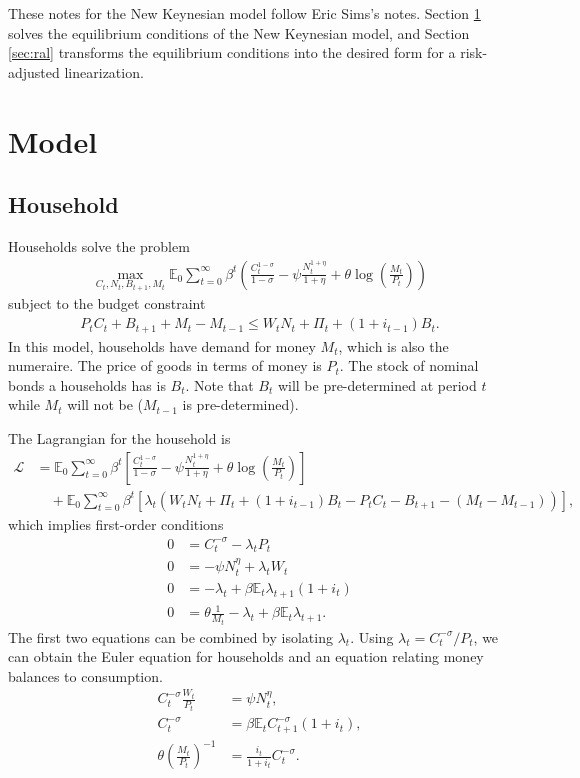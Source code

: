 \documentclass[12 pt, oneside]{article}
\theoremstyle{definition}
\theoremstyle{definition}
\theoremstyle{definition}
\newcommand{\E}{\mathbb{E}}
\newcommand{\calL}{\mathcal{L}}
\begin{document}
These notes for the New Keynesian model follow Eric Sims's notes. Section \ref{sec:model} solves the equilibrium conditions of the New Keynesian model, and Section \ref{sec:ral} transforms the equilibrium conditions into the desired form for a risk-adjusted linearization.

\section{Model}\label{sec:model}


\subsection{Household}

Households solve the problem
\begin{align*}
  \max_{C_t, N_t, B_{t + 1}, M_t} \E_0 \sum_{t = 0}^\infty \beta^t \left( \frac{C_t^{1 - \sigma}}{1 - \sigma} - \psi \frac{N_t^{1 + \eta}}{1 + \eta} + \theta\log\left(\frac{M_t}{P_t}\right) \right)
\end{align*}
subject to the budget constraint
\begin{align*}
  P_tC_t + B_{t + 1} + M_t - M_{t - 1} \leq W_t N_t + \Pi_t + (1 + i_{t - 1})B_t.
\end{align*}
In this model, households have demand for money $M_t$, which is also the numeraire. The price of goods in terms of money is $P_t$.
The stock of nominal bonds a households has is $B_t$.
Note that $B_t$ will be pre-determined at period $t$ while $M_t$ will not be ($M_{t - 1}$ is pre-determined).

The Lagrangian for the household is
\begin{align*}
\calL & = \E_0 \sum_{t = 0}^\infty \beta^t\left[\frac{C_t^{1 - \sigma}}{1 - \sigma} - \psi \frac{N_t^{1 + \eta}}{1 + \eta} + \theta\log\left(\frac{M_t}{P_t}\right)\right]\\
        &\quad + \E_0 \sum_{t = 0}^\infty \beta^t\left[\lambda_t( W_t N_t + \Pi_t + (1 + i_{t - 1})B_t-  P_tC_t - B_{t + 1} - (M_t - M_{t - 1}))\right],
\end{align*}
which implies first-order conditions
\begin{align*}
  0 & = C_t^{- \sigma} - \lambda_t P_t\\
  0 & = -\psi N_t^\eta + \lambda_t W_t\\
  0 & = -\lambda_t + \beta \E_t\lambda_{t + 1}(1 + i_t)\\
  0 & = \theta \frac{1}{M_t} - \lambda_t + \beta\E_t\lambda_{t + 1}.
\end{align*}
The first two equations can be combined by isolating $\lambda_t$.
Using $\lambda_t = C_t^{-\sigma} / P_t$, we can obtain the Euler equation for households
and an equation relating money balances to consumption.
\begin{align*}
  C_t^{-\sigma} \frac{W_t}{P_t} & = \psi N_t^\eta,\\
  C_t^{-\sigma} & = \beta\E_t C_{t + 1}^{-\sigma} ( 1 + i_t),\\
  \theta\left(\frac{M_t}{P_t}\right)^{-1} & = \frac{i_t}{1 + i_t}C_t^{-\sigma}.
\end{align*}
\end{document}
